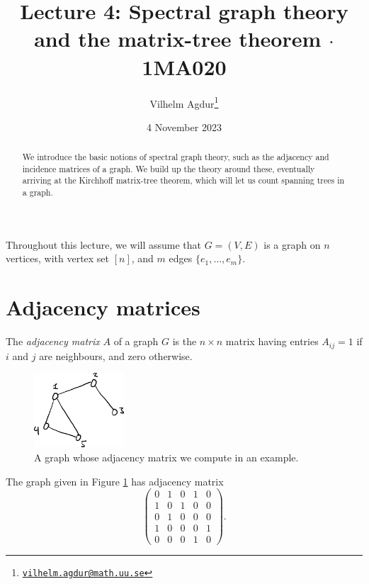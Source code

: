 \documentclass[nobib]{tufte-handout}
\title{Lecture 4: Spectral graph theory and the matrix-tree theorem $\cdot$ 1MA020}
\author[Vilhelm Agdur]{Vilhelm Agdur\thanks{\href{mailto:vilhelm.agdur@math.uu.se}{\nolinkurl{vilhelm.agdur@math.uu.se}}}}
\date{4 November 2023}
\begin{document}
\maketitle%

\begin{abstract}
\noindent
We introduce the basic notions of spectral graph theory, such as the adjacency and incidence matrices of a graph. We build up the theory around these, eventually arriving at the Kirchhoff matrix-tree theorem, which will let us count spanning trees in a graph.
\end{abstract}

Throughout this lecture, we will assume that $G = (V, E)$ is a graph on $n$ vertices, with vertex set $[n]$, and $m$ edges $\{e_1, \ldots, e_m\}$.

\section{Adjacency matrices}

\begin{definition}
    The \emph{adjacency matrix} $A$ of a graph $G$ is the $n\times n$ matrix having entries $A_{ij} = 1$ if $i$ and $j$ are neighbours, and zero otherwise.
\end{definition}

\begin{figure}
    \centering
    \includegraphics[width=0.3\textwidth]{graphics/L4_spectral/graph_for_adjmat.png}
    \caption{A graph whose adjacency matrix we compute in an example.}
    \label{fig:graph_for_adjmat}
\end{figure}

\begin{example}
    The graph given in Figure \ref{fig:graph_for_adjmat} has adjacency matrix
    $$\begin{pmatrix}
        0 & 1 & 0 & 1 & 0 \\
        1 & 0 & 1 & 0 & 0 \\
        0 & 1 & 0 & 0 & 0 \\
        1 & 0 & 0 & 0 & 1 \\
        0 & 0 & 0 & 1 & 0 
        \end{pmatrix}.$$
\end{example}
\end{document}
